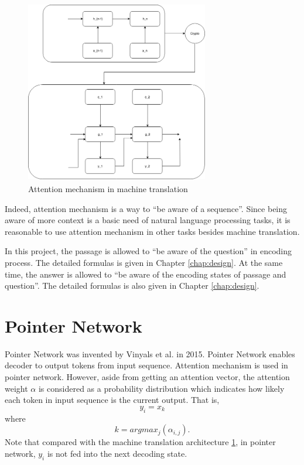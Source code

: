 \documentclass[modernstyle,12pt]{sjsuthesis}
\theoremstyle{definition}
\begin{document}
\begin{figure}[htbp]\centering
  \includegraphics[width=8cm, height=8cm]{figures/attention}
  \caption{Attention mechanism in machine translation}
  \label{f:attention}
\end{figure}



Indeed, attention mechanism is a way to ``be aware of a sequence''. Since being aware of more context is a basic need of natural language processing tasks, it is reasonable to use attention mechanism in other tasks besides machine translation.

In this project, the passage is allowed to ``be aware of the question'' in encoding process. The detailed formulas is given in Chapter \ref{chap:design}. At the same time, the answer is allowed to ``be aware of the encoding states of passage and question''. The detailed formulas is also given in Chapter \ref{chap:design}.




\section{Pointer Network}\label{sect:pointerNet}

Pointer Network\cite{vinyals2015pointer} was invented by Vinyals et al. in 2015. Pointer Network enables decoder to output tokens from input sequence. Attention mechanism is used in pointer network. However, aside from getting an attention vector, the attention weight $\alpha$ is considered as a probability distribution which indicates how likely each token in input sequence is the current output. That is,
$$y_i = x_k$$
where
$$k = argmax_j(\alpha _{i,j}).$$
Note that compared with the machine translation architecture \ref{f:attention}, in pointer network, $y_i$ is not fed into the next decoding state.
\end{document}
